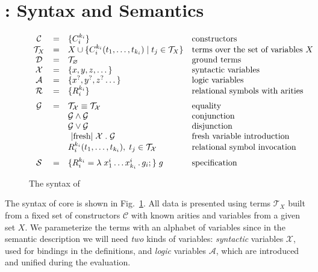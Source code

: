 \section{\mK: Syntax and Semantics}
\label{sec:background}


\begin{figure}[t]
\centering
\[
\begin{array}{ccll}
  \mathcal{C} & = & \{C_i^{k_i}\} & \mbox{constructors} \\
  \mathcal{T}_X & = & X \cup \{C_i^{k_i} (t_1, \dots, t_{k_i}) \mid t_j\in\mathcal{T}_X\} & \mbox{terms over the set of variables $X$} \\
  \mathcal{D} & = & \mathcal{T}_\emptyset & \mbox{ground terms}\\
  \mathcal{X} & = & \{ x, y, z, \dots \} & \mbox{syntactic variables} \\
  \mathcal{A} & = & \{ x^?, y^?, z^? \dots \} & \mbox{logic variables} \\
  \mathcal{R} & = & \{ R_i^{k_i}\} &\mbox{relational symbols with arities} \\[2mm]
  \mathcal{G} & = & \mathcal{T_X}\equiv\mathcal{T_X}   &  \mbox{equality} \\
              &   & \mathcal{G}\wedge\mathcal{G}     & \mbox{conjunction} \\
              &   & \mathcal{G}\vee\mathcal{G}       &\mbox{disjunction} \\
              &   & \mbox{\lstinline|fresh|}\;\mathcal{X}\;.\;\mathcal{G} & \mbox{fresh variable introduction} \\
              &   & R_i^{k_i} (t_1,\dots,t_{k_i}),\;t_j\in\mathcal{T_X} & \mbox{relational symbol invocation} \\[2mm]
  \mathcal{S} & = & \{R_i^{k_i} = \lambda\;x_1^i\dots x_{k_i}^i\,.\, g_i;\}\; g & \mbox{specification}
\end{array}
\]
\caption{The syntax of \mK}
\label{fig:syntax}
\end{figure}

The syntax of core \mK is shown in Fig.~\ref{fig:syntax}. 
All data is presented using terms $\mathcal{T}_X$ built from a fixed set of constructors $\mathcal{C}$ with known arities and variables
from a given set $X$.
We parameterize the terms with an alphabet of variables since in the semantic description we will need \emph{two} kinds of variables:
\emph{syntactic} variables $\mathcal{X}$, used for bindings in the definitions, and \emph{logic} variables $\mathcal{A}$, which are
introduced and unified during the evaluation.


